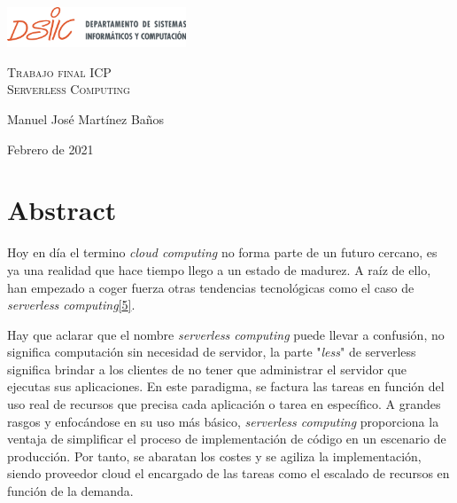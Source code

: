 \documentclass[
]{article}
\begin{document}
\begin{titlepage}
     {\includegraphics[width=0.4\textwidth]{dssic.png}\par}
\vspace{1cm}
      \vspace{3cm}
    {\scshape\Huge\noindent Trabajo final ICP\\\centering  Serverless Computing\par}
         \vspace{2cm}
{\Large Manuel José Martínez Baños\par}
\vfill
{\Large Febrero de 2021 \par}
  \centering
 \end{titlepage}

\tableofcontents 
\cleardoublepage %


\hypertarget{header-n2}{%
\section{Abstract}\label{header-n2}}

Hoy en día el termino \emph{cloud computing} no forma parte de un futuro
cercano, es ya una realidad que hace tiempo llego a un estado de
madurez. A raíz de ello, han empezado a coger fuerza otras tendencias
tecnológicas como el caso de \emph{serverless
computing}\protect\hyperlink{1}{{[}5{]}}.

Hay que aclarar que el nombre \emph{serverless computing} puede llevar a
confusión, no significa computación sin necesidad de servidor, la parte
"\emph{less}" de serverless significa brindar a los
clientes de no tener que administrar el servidor que ejecutas sus
aplicaciones. En este paradigma, se factura las tareas en función del
uso real de recursos que precisa cada aplicación o tarea en específico.
A grandes rasgos y enfocándose en su uso más básico, \emph{serverless
computing} proporciona la ventaja de simplificar el proceso de
implementación de código en un escenario de producción. Por tanto, se
abaratan los costes y se agiliza la implementación, siendo proveedor
cloud el encargado de las tareas como el escalado de recursos en función
de la demanda.
\end{document}
